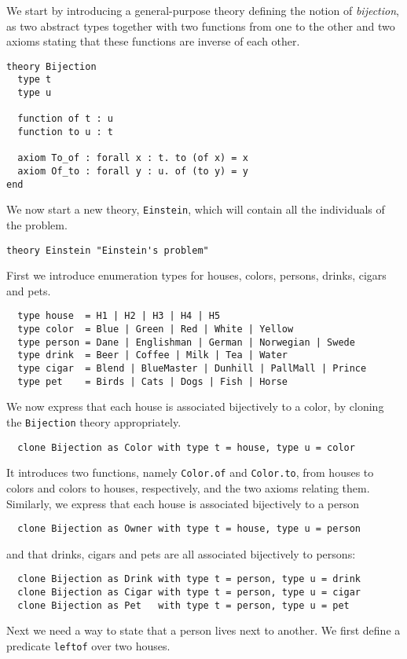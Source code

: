 We start by introducing a general-purpose theory defining the notion
of \emph{bijection}, as two abstract types together with two functions from
one to the other and two axioms stating that these functions are
inverse of each other.
\begin{verbatim}
theory Bijection
  type t
  type u

  function of t : u
  function to u : t

  axiom To_of : forall x : t. to (of x) = x
  axiom Of_to : forall y : u. of (to y) = y
end
\end{verbatim}

We now start a new theory, \texttt{Einstein}, which will contain all
the individuals of the problem.
\begin{verbatim}
theory Einstein "Einstein's problem"
\end{verbatim}
First we introduce enumeration types for houses, colors, persons,
drinks, cigars and pets.
\begin{verbatim}
  type house  = H1 | H2 | H3 | H4 | H5
  type color  = Blue | Green | Red | White | Yellow
  type person = Dane | Englishman | German | Norwegian | Swede
  type drink  = Beer | Coffee | Milk | Tea | Water
  type cigar  = Blend | BlueMaster | Dunhill | PallMall | Prince
  type pet    = Birds | Cats | Dogs | Fish | Horse
\end{verbatim}
We now express that each house is associated bijectively to a color,
by cloning the \texttt{Bijection} theory appropriately.
\begin{verbatim}
  clone Bijection as Color with type t = house, type u = color
\end{verbatim}
It introduces two functions, namely \texttt{Color.of} and
\texttt{Color.to}, from houses to colors and colors to houses,
respectively, and the two axioms relating them.
Similarly, we express that each house is associated bijectively to a
person
\begin{verbatim}
  clone Bijection as Owner with type t = house, type u = person
\end{verbatim}
and that drinks, cigars and pets are all associated bijectively to persons:
\begin{verbatim}
  clone Bijection as Drink with type t = person, type u = drink
  clone Bijection as Cigar with type t = person, type u = cigar
  clone Bijection as Pet   with type t = person, type u = pet
\end{verbatim}
Next we need a way to state that a person lives next to another. We
first define a predicate \texttt{leftof} over two houses.
